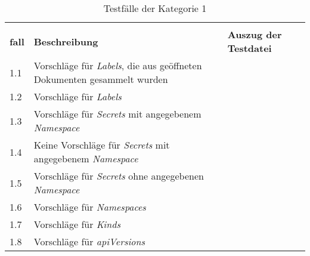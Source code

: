 \begin{table}[H]
    \centering
    \begin{tabularx}{\columnwidth}{lXl}
        \toprule
        \begin{tabular}{@{}l@{}}\textbf{Test-} \\ \textbf{fall} \end{tabular} & \textbf{Beschreibung}                                                          & \textbf{Auszug der Testdatei}                            \\
        \midrule
        1.1                                                                   & Vorschläge für \textit{Labels}, die aus geöffneten Dokumenten gesammelt wurden &  \\
        \midrule
        1.2                                                                   & Vorschläge für \textit{Labels}                                                 &  \\
        \midrule
        1.3                                                                   & Vorschläge für \textit{Secrets} mit angegebenem \textit{Namespace}             &  \\
        \midrule
        1.4                                                                   & Keine Vorschläge für \textit{Secrets} mit angegebenem \textit{Namespace}       &  \\
        \midrule
        1.5                                                                   & Vorschläge für \textit{Secrets} ohne angegebenen \textit{Namespace}            &  \\
        \midrule
        1.6                                                                   & Vorschläge für \textit{Namespaces}                                             &  \\
        \midrule
        1.7                                                                   & Vorschläge für \textit{Kinds}                                                  &  \\
        \midrule
        1.8                                                                   & Vorschläge für \textit{apiVersions}                                            &  \\
        \bottomrule
    \end{tabularx}
    \caption{Testfälle der Kategorie 1}
    \label{tbl:evaluation-test-cases-category-1}
\end{table}

